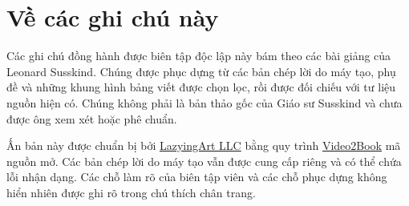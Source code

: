 \documentclass[11pt,oneside]{book}
\begin{document}
\frontmatter
\hypersetup{pageanchor=false}

\hypersetup{pageanchor=true}

\clearpage
\chapter*{Về các ghi chú này}
Các ghi chú đồng hành được biên tập độc lập này bám theo các bài giảng của Leonard Susskind. Chúng được phục dựng từ các bản chép lời do máy tạo, phụ đề và những khung hình bảng viết được chọn lọc, rồi được đối chiếu với tư liệu nguồn hiện có. Chúng không phải là bản thảo gốc của Giáo sư Susskind và chưa được ông xem xét hoặc phê chuẩn.

Ấn bản này được chuẩn bị bởi \href{https://lazying.art}{LazyingArt LLC} bằng quy trình \href{https://github.com/lachlanchen/Video2Book}{Video2Book} mã nguồn mở. Các bản chép lời do máy tạo vẫn được cung cấp riêng và có thể chứa lỗi nhận dạng. Các chỗ làm rõ của biên tập viên và các chỗ phục dựng không hiển nhiên được ghi rõ trong chú thích chân trang.
\clearpage
\tableofcontents
\mainmatter










\end{document}

